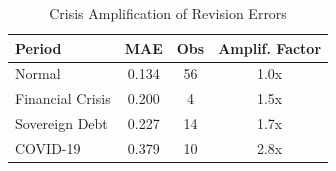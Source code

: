 \begin{table}[t]
\centering
\caption{Crisis Amplification of Revision Errors}
\label{tab:crisis_amplification}
\begin{tabular}{lccc}
\toprule
Period & MAE & Obs & Amplif. Factor \\
\midrule
Normal & 0.134 & 56 & 1.0x \\
Financial Crisis & 0.200 & 4 & 1.5x \\
Sovereign Debt & 0.227 & 14 & 1.7x \\
COVID-19 & 0.379 & 10 & 2.8x \\
\bottomrule
\end{tabular}
\end{table}
